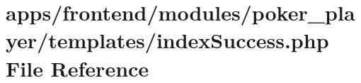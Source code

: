 \hypertarget{frontend_2modules_2poker__player_2templates_2index_success_8php}{\section{apps/frontend/modules/poker\-\_\-player/templates/index\-Success.php File Reference}
\label{frontend_2modules_2poker__player_2templates_2index_success_8php}
}
